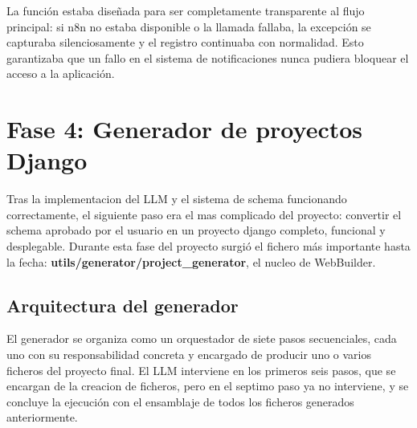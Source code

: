 La función estaba diseñada para ser completamente transparente al flujo principal: si n8n no estaba disponible o la llamada fallaba, la excepción se capturaba silenciosamente y el registro continuaba con normalidad. Esto garantizaba que un fallo en el sistema de notificaciones nunca pudiera bloquear el acceso a la aplicación.


\section{Fase 4: Generador de proyectos Django}
\label{sec:generador-proytectos}

Tras la implementacion del LLM y el sistema de schema funcionando correctamente, el siguiente paso era el mas complicado del proyecto: convertir el schema aprobado por el usuario
en un proyecto django completo, funcional y desplegable. Durante esta fase del proyecto surgió el fichero más importante hasta la fecha: \textbf{utils/generator/project\_generator}, el nucleo de WebBuilder.


\subsection{Arquitectura del generador}
\label{subsec:arquitectura-generador}

El generador se organiza como un orquestador de siete pasos secuenciales, cada uno con su responsabilidad concreta y encargado de producir uno o varios ficheros del proyecto final.
El LLM interviene en los primeros seis pasos, que se encargan de la creacion de ficheros, pero en el septimo paso ya no interviene, y se concluye la ejecución con el ensamblaje de todos los ficheros generados anteriormente.

